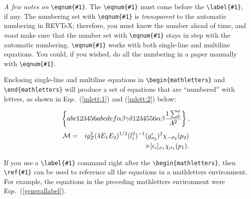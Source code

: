 {\it A few notes on} \verb=\eqnum{#1}=.
The \verb+\eqnum{#1}+ must come before the \verb+\label{#1}+, if any.
The numbering set with \verb+\eqnum{#1}+ is {\it transparent} to the
automatic numbering in REV\TeX{}; therefore,
you must know the number ahead of time, and {\it must\/} make
sure that the number set with \verb+\eqnum{#1}+ stays in step
with the automatic numbering.
\verb+\eqnum{#1}+ works with both single-line and multiline equations.
You could, if you wished, do all the numbering in a paper
manually with \verb+\eqnum{#1}+.

Enclosing single-line and multiline equations in
\verb+\begin{mathletters}+ and \verb+\end{mathletters}+ will produce
a set of equations that are ``numbered'' with letters, as shown
in Eqs.\ (\ref{mlett:1}) and (\ref{mlett:2}) below:
\begin{mathletters}
\label{generallabel}
\begin{equation}
\left\{abc123456abcdef\alpha\beta\gamma\delta%
1234556\alpha\beta{1\sum^{a}_{b}\over A^2}\right\},\label{mlett:1}
\end{equation}
\begin{eqnarray}
{\cal M}=&&ig_Z^2(4E_1E_2)^{1/2}(l_i^2)^{-1}
(g_{\sigma_2}^e)^2\chi_{-\sigma_2}(p_2)\nonumber\\
&&\times
[\epsilon_i]_{\sigma_1}\chi_{\sigma_1}(p_1).\label{mlett:2}
\end{eqnarray}
\end{mathletters}
If you use a \verb+\label{#1}+ command right after the
\verb+\begin{mathletters}+, then \verb+\ref{#1}+ can be used to reference
all the equations in a mathletters environment. For example, the equations
in the preceding mathletters environment were Eqs.\ (\ref{generallabel}).

